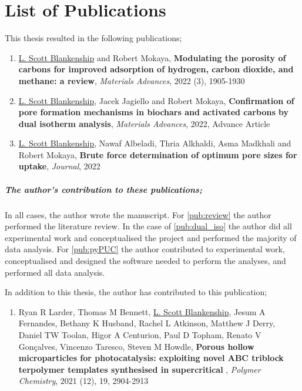 \cleardoublepage
{}

\chapter*{List of Publications}

This thesis resulted in the following publications;

\begin{enumerate}[label=\Roman*, ref={\textbf{Publication \Roman*}}]
    \item \underline{L. Scott Blankenship} and Robert Mokaya, \textbf{Modulating the porosity of carbons for improved adsorption of hydrogen, carbon dioxide, and methane: a review}, \textit{Materials Advances}, 2022 (3), 1905-1930
    \label{pub:review}
    \item \underline{L. Scott Blankenship}, Jacek Jagiello and Robert Mokaya, \textbf{Confirmation of pore formation mechanisms in biochars and activated carbons by dual isotherm analysis}, \textit{Materials Advances}, 2022, Advance Article
    \label{pub:dual_iso}
    \item \underline{L. Scott Blankenship}, Nawaf Albeladi, Thria Alkhaldi, Asma Madkhali and Robert Mokaya, \textbf{Brute force determination of optimum pore sizes for  uptake}, \textit{Journal}, 2022
    \label{pub:pyPUC}
    
\end{enumerate}

\paragraph{The author's contribution to these publications;}
In all cases, the author wrote the manuscript. For \ref{pub:review} the author performed the literature review. In the case of \ref{pub:dual_iso} the author did all experimental work and conceptualised the project and performed the majority of data analysis. For \ref{pub:pyPUC} the author contributed to experimental work, conceptualised and designed the software needed to perform the analyses, and performed all data analysis.

In addition to this thesis, the author has contributed to this publication;

\begin{enumerate}[resume, label=\Roman*, ref={\textbf{Publication \Roman*}}]
    \item Ryan R Larder, Thomas M Bennett, \underline{L. Scott Blankenship}, Jesum A Fernandes, Bethany K Husband, Rachel L Atkinson, Matthew J Derry, Daniel TW Toolan, Higor A Centurion, Paul D Topham, Renato V Gonçalves, Vincenzo Taresco, Steven M Howdle, \textbf{Porous hollow  microparticles for photocatalysis: exploiting novel ABC triblock terpolymer templates synthesised in supercritical }, \textit{Polymer Chemistry}, 2021 (12), 19, 2904-2913
    \label{pub:larder}
    
\end{enumerate}

